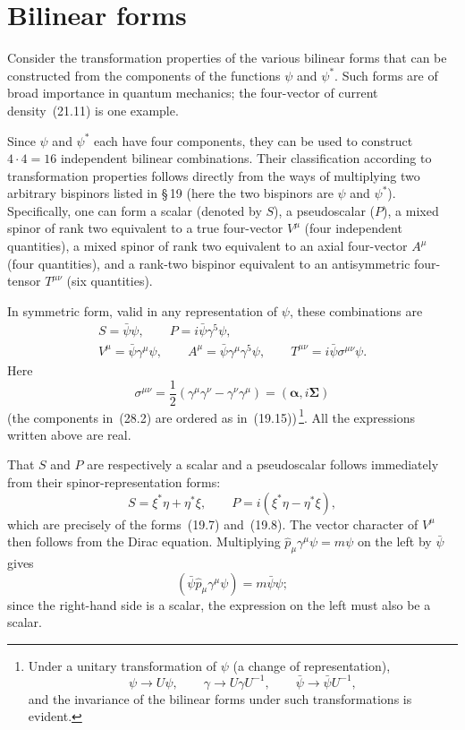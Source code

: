 \section{Bilinear forms}

Consider the transformation properties of the various bilinear forms that can be constructed from the components of the functions $\psi$ and $\psi^*$. Such forms are of broad importance in quantum mechanics; the four-vector of current density~(21.11) is one example.

Since $\psi$ and $\psi^*$ each have four components, they can be used to construct $4 \cdot 4 = 16$ independent bilinear combinations. Their classification according to transformation properties follows directly from the ways of multiplying two arbitrary bispinors listed in \S\,19 (here the two bispinors are $\psi$ and $\psi^*$). Specifically, one can form a scalar (denoted by $S$), a pseudoscalar ($P$), a mixed spinor of rank two equivalent to a true four-vector $V^\mu$ (four independent quantities), a mixed spinor of rank two equivalent to an axial four-vector $A^\mu$ (four quantities), and a rank-two bispinor equivalent to an antisymmetric four-tensor $T^{\mu\nu}$ (six quantities).

In symmetric form, valid in any representation of $\psi$, these combinations are
\begin{equation}
\begin{gathered}
S = \bar\psi\psi,\qquad P = i\bar\psi\gamma^5\psi,\\
V^\mu = \bar\psi\gamma^\mu\psi,\qquad A^\mu = \bar\psi\gamma^\mu\gamma^5\psi,\qquad T^{\mu\nu} = i\bar\psi\sigma^{\mu\nu}\psi.
\end{gathered}
\tag{28.1}
\end{equation}
Here
\begin{equation}
\sigma^{\mu\nu} = \frac{1}{2}(\gamma^\mu\gamma^\nu - \gamma^\nu\gamma^\mu) = (\boldsymbol{\alpha},i\boldsymbol{\Sigma})
\tag{28.2}
\end{equation}
(the components in~(28.2) are ordered as in~(19.15))\,\footnote{Under a unitary transformation of $\psi$ (a change of representation),
\[
\psi \to U\psi,\qquad \gamma \to U\gamma U^{-1},\qquad \bar\psi \to \bar\psi U^{-1},
\]
and the invariance of the bilinear forms under such transformations is evident.}. All the expressions written above are real.

That $S$ and $P$ are respectively a scalar and a pseudoscalar follows immediately from their spinor-representation forms:
\[
S = \xi^*\eta + \eta^*\xi,\qquad P = i(\xi^*\eta - \eta^*\xi),
\]
which are precisely of the forms~(19.7) and~(19.8). The vector character of $V^\mu$ then follows from the Dirac equation. Multiplying $\widehat p_\mu\gamma^\mu\psi = m\psi$ on the left by $\bar\psi$ gives
\[
(\bar\psi\widehat p_\mu\gamma^\mu\psi) = m\bar\psi\psi;
\]
since the right-hand side is a scalar, the expression on the left must also be a scalar.

